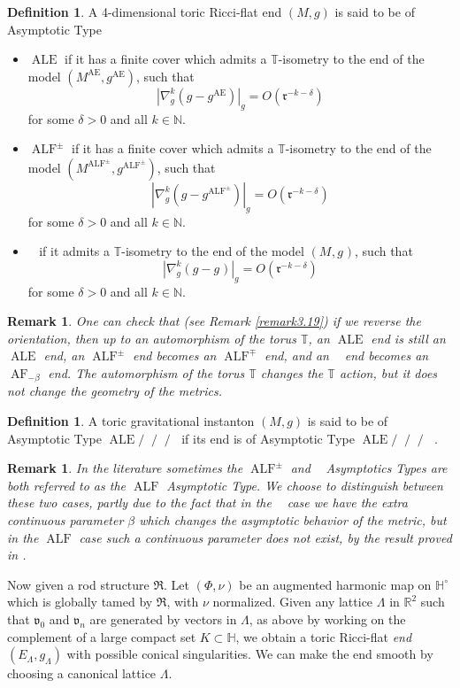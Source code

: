\documentclass[a4paper,11pt]{amsart}
\newtheorem{remark}[theorem]{Remark}
\theoremstyle{definition}
\newtheorem{definition}[theorem]{Definition}
\numberwithin{equation}{section}
\newcommand{\dH}{\mathbb{H}}
\newcommand{\R}{\mathbb{R}}
\newcommand{\dT}{\mathbb{T}}
\newcommand{\mv} {\mathfrak v}
\newcommand{\mR} {\mathfrak R}
\DeclareMathOperator{\Ae}{AE}
\DeclareMathOperator{\ALe}{ALE}
\DeclareMathOperator{\ALF}{ALF}
\DeclareMathOperator{\ALE}{ALE}
\DeclareMathOperator{\ALFp}{ALF^+}
\DeclareMathOperator{\ALFm}{ALF^{--}}
\DeclareMathOperator{\AF}{AF}
\DeclareMathOperator{\AFa}{AF_\beta}
\begin{document}
\begin{definition}\label{def:Type of gravitational instantons}
 A 4-dimensional toric Ricci-flat end $(M,g)$ is said to be  of  Asymptotic Type
 \begin{itemize}
   \item   $\ALe$ if it has a finite cover which admits a $\dT$-isometry to the end of the model $(M^{\Ae}, g^{\Ae})$, such that $$|\nabla^k_{g}(g-g^{\Ae})|_g=O(\mathfrak r^{-k-\delta})$$ for some $\delta>0$ and all $k\in\mathbb{N}$.
   \item $\ALF^{\pm}$ if it has a finite cover which admits a $\dT$-isometry to the end of the model $(M^{\ALF^{\pm}}, g^{\ALF^{\pm}})$, such that $$|\nabla^k_{g}(g-g^{\ALF^{\pm}})|_g=O(\mathfrak r^{-k-\delta})$$ for some $\delta>0$ and all $k\in\mathbb{N}$.
  \item  $\AFa$ if it admits a $\dT$-isometry to the end of the model $(M^{\AFa}, g^{\AFa})$, such that $$|\nabla^k_{g}(g-g^{\AFa})|_g=O(\mathfrak r^{-k-\delta})$$ for some $\delta>0$ and all $k\in\mathbb{N}$.
 \end{itemize}
\begin{remark}
    One can check  that (see Remark \ref{remark3.19}) if we reverse the orientation,  then up to an automorphism of the torus $\dT$, an $\ALE$ end is still an $\ALE$ end, an $\ALF^{\pm}$ end becomes an $\ALF^{\mp}$ end,  and an $\AFa$ end becomes an $\AF_{-\beta}$ end. The automorphism of the torus $\dT$ changes the $\dT$ action, but it does not change the geometry of the metrics. 
    \end{remark}
\end{definition}


\begin{definition}
A toric gravitational instanton $(M, g)$ is said to be of  Asymptotic Type $\ALe/\ALFp/\ALFm/\AFa$ if its end is of Asymptotic Type $\ALe/\ALFp/\ALFm/\AFa$ .
\end{definition}
\begin{remark}
    In the literature sometimes the $\ALF^{\pm}$ and $\AFa$ Asymptotics Types are both referred to as the $\ALF$ Asymptotic Type. We choose to distinguish between these two cases, partly due to the fact that in the $\AFa$ case we have the extra continuous parameter $\beta$ which changes the asymptotic behavior of the metric, but in the $\ALF$ case such a continuous parameter does not exist, by the result proved in \cite{LS2024}.
\end{remark}
Now given a rod structure  $\mathfrak R$. Let  $(\Phi, \nu)$ be an augmented harmonic map on $\dH^\circ$ which is  globally tamed by $\mR$, with $\nu$ normalized. Given any lattice $\Lambda$ in $\R^2$ such that $\mv_0$ and $\mv_n$ are generated by vectors in $\Lambda$, as above by working on the complement of a large compact set $K\subset \dH$, we obtain a toric Ricci-flat \emph{end} $(E_\Lambda, g_{\Lambda})$ with possible conical singularities. We can make the end smooth by choosing a canonical lattice $\Lambda$.
\end{document}
